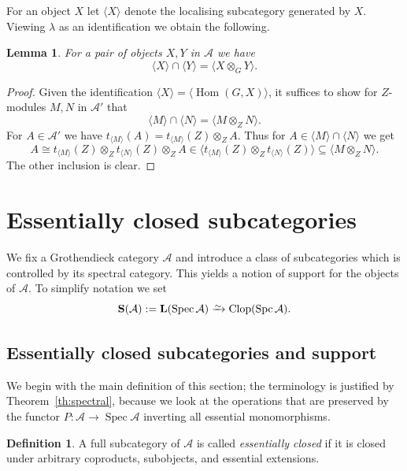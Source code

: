 \documentclass[a4paper]{amsart}
\theoremstyle{plain}
\newtheorem{lem}[thm]{Lemma}
\theoremstyle{definition}
\newtheorem{defn}[thm]{Definition}
\theoremstyle{remark}
\numberwithin{equation}{section}
\newcommand{\Clop}{\operatorname{Clop}}
\newcommand{\Hom}{\operatorname{Hom}}
\newcommand{\Spc}{\operatorname{Spc}}
\newcommand{\Spec}{\operatorname{Spec}}
\newcommand{\iso}{\xrightarrow{\raisebox{-.4ex}[0ex][0ex]{$\scriptstyle{\sim}$}}}
\def\A{\mathcal A}
\def\bfL{\mathbf L}
\def\bfS{\mathbf S}
\begin{document}
For an object $X$ let $\langle X\rangle$ denote the
localising subcategory generated by  $X$. Viewing
$\lambda$ as an identification we obtain the following.


\begin{lem}\label{le:tensor}
  For a pair of objects $X,Y$ in $\A$ we have \[\langle X\rangle\cap
  \langle Y\rangle=\langle X\otimes_GY\rangle.\]
\end{lem}
\begin{proof}
  Given the identification $\langle X\rangle=\langle
  \Hom(G,X)\rangle$, it suffices to show for $Z$-modules $M,N$ in
  $\A'$ that 
\[\langle M\rangle\cap
  \langle N\rangle=\langle M\otimes_ZN\rangle.\] 
For $A\in\A'$  we have $t_{\langle M\rangle}(A)=t_{\langle M\rangle}(Z)\otimes_Z A$.
  Thus for $A\in \langle M\rangle\cap \langle N\rangle$ we
  get
  \[A\cong t_{\langle M\rangle}(Z)\otimes_Z t_{\langle
      N\rangle}(Z)\otimes_Z A\in \langle t_{\langle
      M\rangle}(Z)\otimes_Z t_{\langle N\rangle}(Z)\rangle\subseteq
    \langle M\otimes_ZN\rangle.\] The other inclusion is clear.
\end{proof}



\section{Essentially closed subcategories}\label{se:spec-sub}

We fix a Grothendieck category $\A$ and introduce a class of
subcategories which is controlled by its spectral category.  This
yields a notion of support for the objects of $\A$.  To simplify
notation we set
\[\bfS(\A):=\bfL(\Spec\A)\iso\Clop(\Spc\A).\]

\subsection*{Essentially closed subcategories and support}

We begin with the main definition of this section; the terminology is
justified by Theorem~\ref{th:spectral}, because we look at the
operations that are preserved by the functor $P\colon\A\to\Spec\A$ inverting
all essential monomorphisms.

\begin{defn}\label{de:spectral-subcat}
  A full subcategory of $\A$ is called \emph{essentially closed} if it
  is closed under arbitrary coproducts, subobjects, and essential
  extensions.
\end{defn}
\end{document}
